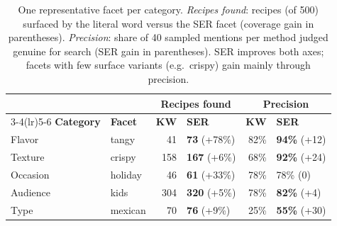 \begin{table}[t]
\centering
\small
\setlength{\tabcolsep}{4.5pt}
\begin{tabular}{@{}ll rl rl@{}}
\toprule
& & \multicolumn{2}{c}{\textbf{Recipes found}} & \multicolumn{2}{c}{\textbf{Precision}} \\
\cmidrule(lr){3-4}\cmidrule(lr){5-6}
\textbf{Category} & \textbf{Facet} & \textbf{KW} & \textbf{SER} & \textbf{KW} & \textbf{SER} \\
\midrule
Flavor   & tangy   & 41  & \textbf{73} (+78\%)  & 82\% & \textbf{94\%} (+12) \\
Texture  & crispy  & 158 & \textbf{167} (+6\%)  & 68\% & \textbf{92\%} (+24) \\
Occasion & holiday & 46  & \textbf{61} (+33\%)  & 78\% & 78\% (0) \\
Audience & kids    & 304 & \textbf{320} (+5\%)  & 78\% & \textbf{82\%} (+4) \\
Type     & mexican & 70  & \textbf{76} (+9\%)   & 25\% & \textbf{55\%} (+30) \\
\bottomrule
\end{tabular}
\caption{One representative facet per category. \emph{Recipes found}: recipes (of 500) surfaced by the literal word versus the SER facet (coverage gain in parentheses). \emph{Precision}: share of 40 sampled mentions per method judged genuine for search (SER gain in parentheses). SER improves both axes; facets with few surface variants (e.g.\ crispy) gain mainly through precision.}
\label{tab:facet-coverage-precision}
\end{table}
